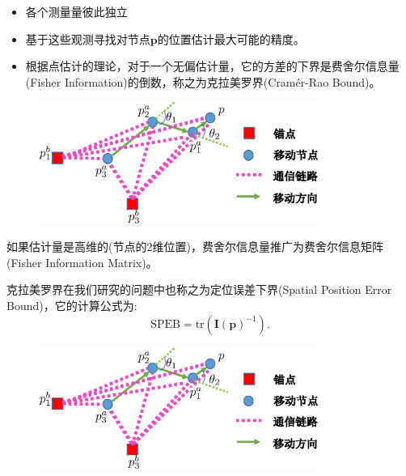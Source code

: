 \begin{frame}
\begin{itemize}
\item 各个测量量彼此独立

\item 基于这些观测寻找对节点$\bm{p}$的位置估计最大可能的精度。

\pause
\item 根据点估计的理论，对于一个无偏估计量，它的方差的下界是\alert{费舍尔信息量}(Fisher Information)的倒数，称之为\alert{克拉美罗界}(Cram\'er-Rao Bound)。
\end{itemize}
     \begin{figure}
          \centering
          \includegraphics[height=4cm]{cooperative_single_temporal.eps}
     \end{figure}

\end{frame}
\begin{frame}
如果估计量是高维的(节点的\alert{2维}位置)，费舍尔信息量推广为\alert{费舍尔信息矩阵}(Fisher Information Matrix)。


克拉美罗界在我们研究的问题中也称之为\alert{定位误差下界}(Spatial Position Error Bound)，它的计算公式为:
\begin{equation*}
  \text{SPEB}=\text{tr}(\bm{I(\bm{p})}^{-1}).
\end{equation*}
     \begin{figure}
          \centering
          \includegraphics[height=4cm]{cooperative_single_temporal.eps}
     \end{figure}

\end{frame}

